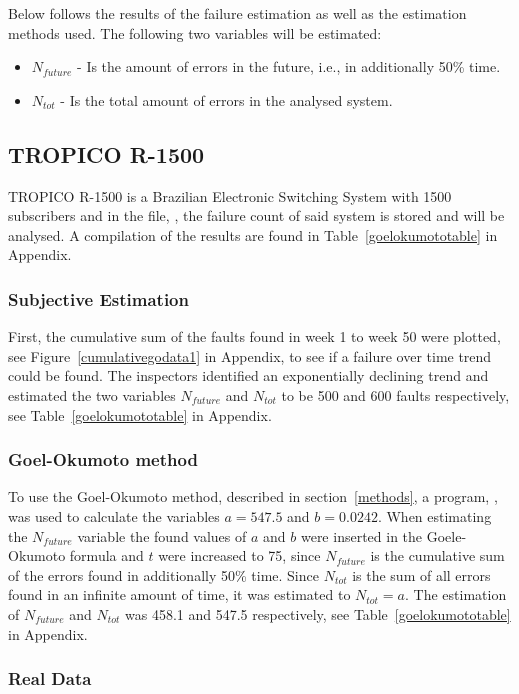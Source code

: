 Below follows the results of the failure estimation as well as the estimation methods used. 
The following two variables will be estimated:
\begin{itemize}
 \item $N_{future}$ - Is the amount of errors in the future, i.e., in additionally 50\% time.
 \item $N_{tot}$ - Is the total amount of errors in the analysed system.
\end{itemize}

\subsection{TROPICO R-1500}
TROPICO R-1500 is a Brazilian Electronic Switching System with 1500 subscribers and in the file, , the failure count of said system is stored and will be analysed. A compilation of the results are found in Table~\ref{goelokumototable} in Appendix.
\subsubsection*{Subjective Estimation} 
First, the cumulative sum of the faults found in week 1 to week 50 were plotted, see Figure~\ref{cumulativegodata1} in Appendix, to see if a failure over time trend could be found.
The inspectors identified an exponentially declining trend and estimated the two variables $N_{future}$ and $N_{tot}$ to be 500 and 600 faults respectively, see Table~\ref{goelokumototable} in Appendix. 
\subsubsection*{Goel-Okumoto method}
To use the Goel-Okumoto method, described in section~\ref{methods}, a program, , was used to calculate the variables $a=547.5$ and $b=0.0242$.
When estimating the $N_{future}$ variable the found values of $a$ and $b$ were inserted in the Goele-Okumoto formula and $t$ were increased to 75, since $N_{future}$ is the cumulative sum of the errors found in additionally 50\% time. 
Since $N_{tot}$ is the sum of all errors found in an infinite amount of time, it was estimated to $N_{tot} = a$.
The estimation of $N_{future}$ and $N_{tot}$ was 458.1 and 547.5 respectively, see Table~\ref{goelokumototable} in Appendix.
\subsubsection*{Real Data}

